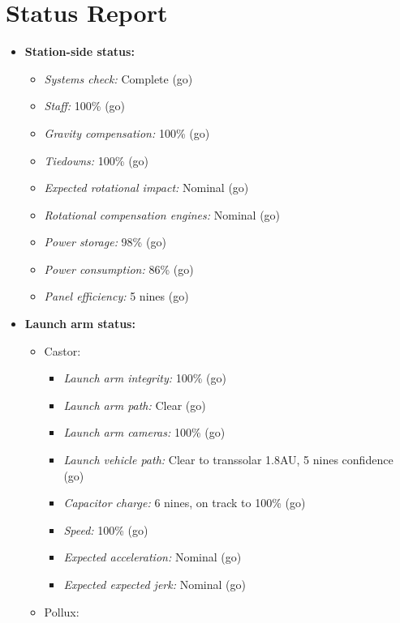 \hypertarget{status-report-1}{%
\section{Status Report}\label{status-report-1}}

\begin{itemize}
\tightlist
\item
  \textbf{Station-side status:}

  \begin{itemize}
  \tightlist
  \item
    \emph{Systems check:} Complete (go)
  \item
    \emph{Staff:} 100\% (go)
  \item
    \emph{Gravity compensation:} 100\% (go)
  \item
    \emph{Tiedowns:} 100\% (go)
  \item
    \emph{Expected rotational impact:} Nominal (go)
  \item
    \emph{Rotational compensation engines:} Nominal (go)
  \item
    \emph{Power storage:} 98\% (go)
  \item
    \emph{Power consumption:} 86\% (go)
  \item
    \emph{Panel efficiency:} 5 nines (go)
  \end{itemize}
\item
  \textbf{Launch arm status:}

  \begin{itemize}
  \tightlist
  \item
    Castor:

    \begin{itemize}
    \tightlist
    \item
      \emph{Launch arm integrity:} 100\% (go)
    \item
      \emph{Launch arm path:} Clear (go)
    \item
      \emph{Launch arm cameras:} 100\% (go)
    \item
      \emph{Launch vehicle path:} Clear to transsolar 1.8AU, 5 nines confidence (go)
    \item
      \emph{Capacitor charge:} 6 nines, on track to 100\% (go)
    \item
      \emph{Speed:} 100\% (go)
    \item
      \emph{Expected acceleration:} Nominal (go)
    \item
      \emph{Expected expected jerk:} Nominal (go)
    \end{itemize}
  \item
    Pollux:


\end{itemize}
\end{itemize}
